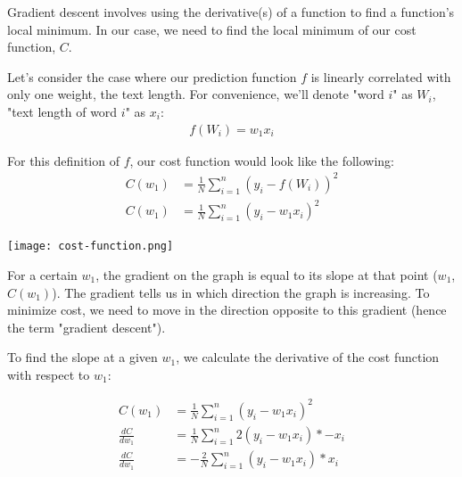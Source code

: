 \documentclass[12pt, demo]{article}
\begin{document}
Gradient descent involves using the derivative(s) of a function to find a function's local minimum. In our case, we need to find the local minimum of our cost function, $C$.

Let's consider the case where our prediction function $f$ is linearly correlated with only one weight, the text length. For convenience, we'll denote "word $i$" as $W_i$, "text length of word $i$" as $x_i$:
\begin{align}
	f(W_i) = w_1x_i
\end{align}

For this definition of $f$, our cost function would look like the following:
\begin{align}
	C(w_1) & = \frac{1}{N} \sum_{i=1}^{n} (y_i - f(W_i))^2
	\\
	C(w_1) & = \frac{1}{N} \sum_{i=1}^{n} (y_i - w_1x_i)^2
\end{align}

\texttt{[image: cost-function.png]}

For a certain $w_1$, the gradient on the graph is equal to its slope at that point ($w_1$, $C(w_1)$). The gradient tells us in which direction the graph is increasing. To minimize cost, we need to move in the direction opposite to this gradient (hence the term "gradient descent").

To find the slope at a given $w_1$, we calculate the derivative of the cost function with respect to $w_1$:

\begin{align*}
	C(w_1)          & = \frac{1}{N} \sum_{i=1}^{n} (y_i - w_1x_i)^2
	\\
	\frac{dC}{dw_1} & = \frac{1}{N} \sum_{i=1}^{n} 2(y_i - w_1x_i) * -x_i
	\\
	\frac{dC}{dw_1} & = -\frac{2}{N} \sum_{i=1}^{n} (y_i - w_1x_i) * x_i
\end{align*}

\end{document}
